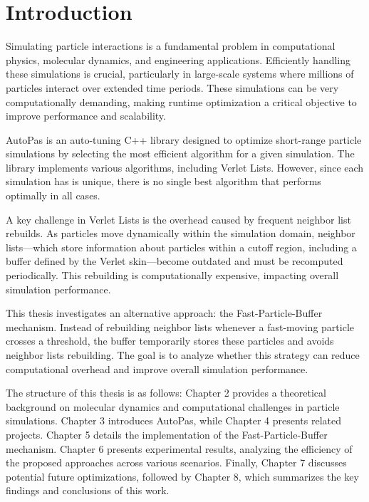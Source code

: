 \chapter{Introduction}\label{chapter:introduction}


Simulating particle interactions is a fundamental problem in computational physics, molecular dynamics, and engineering applications. Efficiently handling these simulations is crucial, particularly in large-scale systems where millions of particles interact over extended time periods. These simulations can be very computationally demanding, making runtime optimization a critical objective to improve performance and scalability. \parencite{aktulga2012parallel}


AutoPas is an auto-tuning C++ library designed to optimize short-range particle simulations by selecting the most efficient algorithm for a given simulation. The library implements various algorithms, including Verlet Lists. However, since each simulation has is unique, there is no single best algorithm that performs optimally in all cases. \parencite{seckler2021autopas}

A key challenge in Verlet Lists is the overhead caused by frequent neighbor list rebuilds. As particles move dynamically within the simulation domain, neighbor lists—which store information about particles within a cutoff region, including a buffer defined by the Verlet skin—become outdated and must be recomputed periodically. This rebuilding is computationally expensive, impacting overall simulation performance.

This thesis investigates an alternative approach: the Fast-Particle-Buffer mechanism. Instead of rebuilding neighbor lists whenever a fast-moving particle crosses a threshold, the buffer temporarily stores these particles and avoids neighbor lists rebuilding. The goal is to analyze whether this strategy can reduce computational overhead and improve overall simulation performance.


The structure of this thesis is as follows: Chapter 2 provides a theoretical background on molecular dynamics and computational challenges in particle simulations.  Chapter 3 introduces AutoPas, while Chapter 4 presents related projects. Chapter 5 details the implementation of the Fast-Particle-Buffer mechanism. Chapter 6 presents experimental results, analyzing the efficiency of the proposed approaches across various scenarios. Finally, Chapter 7 discusses potential future optimizations, followed by Chapter 8, which summarizes the key findings and conclusions of this work.
